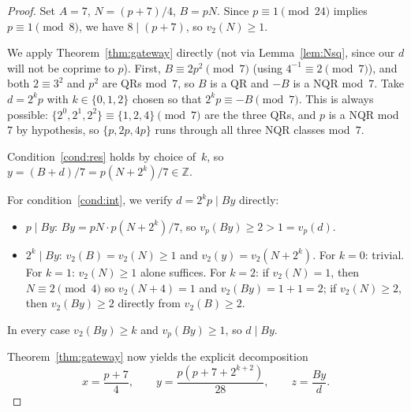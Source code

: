 \documentclass[12pt]{amsart}
\theoremstyle{definition}
\theoremstyle{remark}
\begin{document}
\begin{proof}
Set $A = 7$, $N = (p+7)/4$, $B = pN$.
Since $p \equiv 1 \pmod{24}$ implies $p \equiv 1 \pmod 8$, we have
$8 \mid (p+7)$, so $v_2(N) \geq 1$.

We apply Theorem~\ref{thm:gateway} directly (not via Lemma~\ref{lem:Nsq},
since our $d$ will not be coprime to $p$).
First, $B \equiv 2p^2 \pmod 7$ (using $4^{-1} \equiv 2 \pmod 7$), and
both $2 \equiv 3^2$ and $p^2$ are QRs mod~$7$, so $B$ is a QR and $-B$ is
a NQR mod~$7$.
Take $d = 2^k p$ with $k \in \{0, 1, 2\}$ chosen so that
$2^k p \equiv -B \pmod 7$.
This is always possible: $\{2^0, 2^1, 2^2\} \equiv \{1, 2, 4\} \pmod 7$
are the three QRs, and $p$ is a NQR mod~$7$ by hypothesis, so
$\{p, 2p, 4p\}$ runs through all three NQR classes mod~$7$.

Condition~\ref{cond:res} holds by choice of~$k$, so
$y = (B+d)/7 = p(N + 2^k)/7 \in \mathbb{Z}$.

For condition~\ref{cond:int}, we verify $d = 2^k p \mid By$ directly:
\begin{itemize}
  \item \emph{$p \mid By$}: $By = pN \cdot p(N+2^k)/7$, so $v_p(By) \geq 2 > 1 = v_p(d)$.
  \item \emph{$2^k \mid By$}: $v_2(B) = v_2(N) \geq 1$ and $v_2(y) = v_2(N + 2^k)$.
    For $k = 0$: trivial. For $k = 1$: $v_2(N) \geq 1$ alone suffices.
    For $k = 2$: if $v_2(N) = 1$, then $N \equiv 2 \pmod 4$ so $v_2(N+4) = 1$
    and $v_2(By) = 1 + 1 = 2$; if $v_2(N) \geq 2$, then $v_2(By) \geq 2$ directly
    from $v_2(B) \geq 2$.
\end{itemize}
In every case $v_2(By) \geq k$ and $v_p(By) \geq 1$, so $d \mid By$.\checkmark

Theorem~\ref{thm:gateway} now yields the explicit decomposition
\[
  x = \frac{p+7}{4}, \qquad
  y = \frac{p(p+7+2^{k+2})}{28}, \qquad
  z = \frac{By}{d}.
\]
\end{proof}
\end{document}
